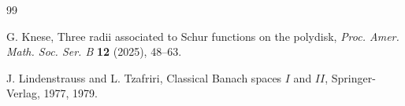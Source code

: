 \documentclass[a4paper,11pt, reqno]{amsart}
\theoremstyle{definition}
\begin{document}
\begin{thebibliography}{99}
	
	
	
	
	
	 {\sc G. Knese}, Three radii associated to Schur functions on the polydisk, {\it Proc. Amer. Math. Soc. Ser. B} {\bf 12} (2025), 48--63.
	
	
	
	
	
	 {\sc J. Lindenstrauss} and {\sc L. Tzafriri}, Classical Banach spaces $I$ and $II$, Springer-Verlag, 1977, 1979.
	
	

\end{thebibliography}
\end{document}
